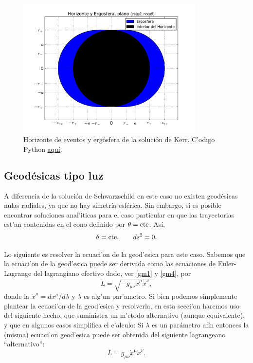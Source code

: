 \begin{figure}[H]
 \centering
\includegraphics[height=7cm,angle=0]{fig/fig-superficies-3.pdf}
\caption{Horizonte de eventos y erg\'osfera de la soluci\'on de Kerr. C'odigo Python  \href{https://github.com/gfrubi/GR/blob/master/figuras-editables/fig-superficies-Kerr-01.py}{aqu\'i}.}
\label{fig:surface3}
\end{figure}

\subsection{Geod\'esicas tipo luz}

A diferencia de la soluci\'on de Schwarzschild en este caso no existen geod\'esicas nulas radiales, ya que no hay simetr\'ia esf\'erica. Sin embargo, s\'i es posible encontrar soluciones anal'iticas para el caso particular en que las trayectorias est'an contenidas en el cono definido por $\theta=\rm cte$. As\'i,
\begin{equation}
\theta={\rm cte},\qquad ds^2=0.
\end{equation}

Lo siguiente es resolver la ecuaci'on de la geod'esica para este caso. Sabemos que la ecuaci'on de la geod'esica puede ser derivada como las ecuaciones de Euler-Lagrange del lagrangiano efectivo dado, ver \eqref{gm1} y \eqref{gm4}, por
\begin{equation} \label{lagrange1}
\tilde{L}=\sqrt{-g_{\mu \nu}\dot{x}^{\mu}\dot{x}^{\nu}},
\end{equation}
donde la $\dot{x}^{\mu}=dx^\mu/d\lambda$ y $\lambda$ es alg'un par'ametro. Si bien podemos simplemente plantear la ecuaci'on de la geod'esica y resolverla, en esta secci'on haremos uso del siguiente hecho, que suministra un m'etodo alternativo (aunque equivalente), y que en algunos casos simplifica el c'alculo: Si $\lambda$ es un par\'ametro af\'in entonces la (misma) ecuaci'on geod'esica puede ser obtenida del siguiente lagrangeano ``alternativo'':
\begin{equation} \label{lagrange2}
\bar{L}= g_{\mu \nu}\dot{x}^{\mu}\dot{x}^{\nu}.
\end{equation}
 
